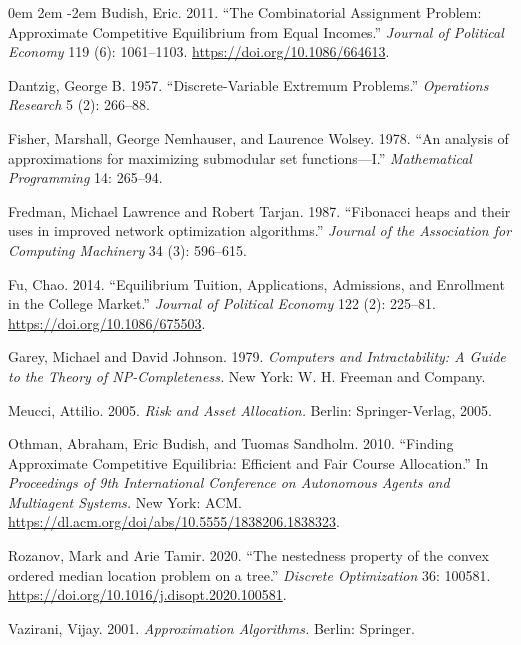 \documentclass[12pt]{article} %
\theoremstyle{definition}
\theoremstyle{definition}
\begin{document}
\parskip 0em
\leftskip 2em
\parindent -2em
Budish, Eric. 2011. ``The Combinatorial Assignment Problem: Approximate Competitive Equilibrium from Equal Incomes.'' \emph{Journal of Political Economy} 119 (6): 1061--1103. \url{https://doi.org/10.1086/664613}. 

Dantzig, George B. 1957. ``Discrete-Variable Extremum Problems.'' \emph{Operations Research} 5 (2): 266--88.

Fisher, Marshall, George Nemhauser, and Laurence Wolsey. 1978. ``An analysis of approximations for maximizing submodular set functions—I.'' \emph{Mathematical Programming} 14: 265--94. 

Fredman, Michael Lawrence and Robert Tarjan. 1987. ``Fibonacci heaps and their uses in improved network optimization algorithms.'' \emph{Journal of the Association for Computing Machinery} 34 (3): 596--615.

Fu, Chao. 2014. ``Equilibrium Tuition, Applications, Admissions, and Enrollment in the College Market.'' \emph{Journal of Political Economy} 122 (2): 225--81. \url{https://doi.org/10.1086/675503}. 

Garey, Michael and David Johnson. 1979. \emph{Computers and Intractability: A Guide to the Theory of NP-Completeness.} New York: W. H. Freeman and Company. 

Meucci, Attilio. 2005. \emph{Risk and Asset Allocation.} Berlin: Springer-Verlag, 2005. 

Othman, Abraham, Eric Budish, and Tuomas Sandholm. 2010. ``Finding Approximate Competitive Equilibria: Efficient and Fair
Course Allocation.'' In \emph{Proceedings of 9th International Conference on Autonomous Agents and Multiagent Systems.} New York: ACM. \url{https://dl.acm.org/doi/abs/10.5555/1838206.1838323}.

Rozanov, Mark and Arie Tamir. 2020. ``The nestedness property of the convex ordered median location problem on a tree.'' \emph{Discrete Optimization} 36: 100581. \url{https://doi.org/10.1016/j.disopt.2020.100581}.

Vazirani, Vijay. 2001. \emph{Approximation Algorithms.} Berlin: Springer. 
\end{document}
